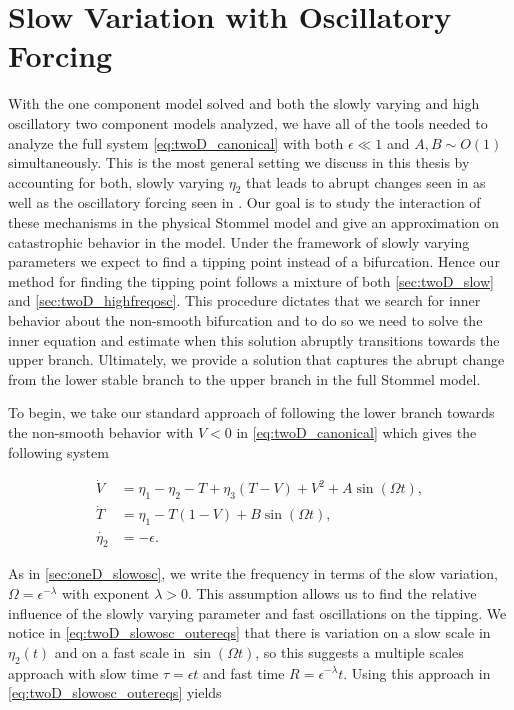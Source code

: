\section{Slow Variation with Oscillatory Forcing}
\label{sec:twoD_slowosc}

With the one component model solved and both the slowly varying and high oscillatory two component models analyzed, we have all of the tools needed to analyze the full system \eqref{eq:twoD_canonical} with both $\epsilon \ll 1$ and $A,B\sim O(1)$ simultaneously. This is the most general setting we discuss in this thesis by accounting for both, slowly varying $\eta_2$ that leads to abrupt changes seen in \cite{alley2003abrupt,marotzke2000abrupt,rahmstorf2000thermohaline} as well as the oscillatory forcing seen in \cite{roberts2017relaxation,huybers2005obliquity}. Our goal is to study the interaction of these mechanisms in the physical Stommel model and give an approximation on catastrophic behavior in the model. Under the framework of slowly varying parameters we expect to find a tipping point instead of a bifurcation. Hence our method for finding the tipping point follows a mixture of both \autoref{sec:twoD_slow} and \autoref{sec:twoD_highfreqosc}. This procedure dictates that we search for inner behavior about the non-smooth bifurcation and to do so we need to solve the inner equation and estimate when this solution abruptly transitions towards the upper branch. Ultimately, we provide a solution that captures the abrupt change from the lower stable branch to the upper branch in the full Stommel model.

\indent To begin, we take our standard approach of following the lower branch towards the non-smooth behavior with $V<0$ in \eqref{eq:twoD_canonical} which gives the following system 

\begin{equation}\label{eq:twoD_slowosc_outereqs}
 \begin{aligned}
  \dot{V} & = \eta_1-\eta_2-T+\eta_3(T-V)+V^2+A\sin(\Omega t), \\
  \dot{T} & = \eta_1-T(1-V)+B\sin(\Omega t), \\
 \dot{\eta_2} & = -\epsilon.
 \end{aligned}
\end{equation}

As in \autoref{sec:oneD_slowosc}, we write the frequency in terms of the slow variation, $\Omega = \epsilon^{-\lambda}$ with exponent $\lambda>0$. This assumption allows us to find the relative influence of the slowly varying parameter and fast oscillations on the tipping. We notice in \eqref{eq:twoD_slowosc_outereqs} that there is variation on a slow scale in $\eta_2(t)$ and on a fast scale in $\sin(\Omega t)$, so this suggests a multiple scales approach with slow time $\tau = \epsilon t$ and fast time $R=\epsilon^{-\lambda}t$. Using this approach in \eqref{eq:twoD_slowosc_outereqs} yields

